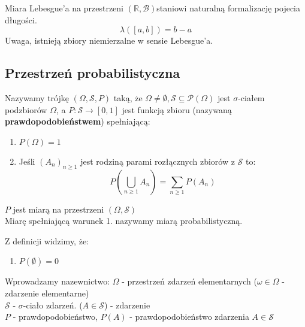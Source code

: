 \documentclass{article}
\newenvironment{definition}[1]{%
    \trivlist
    \item[\hskip\labelsep\textbf{Definition. #1.}]
    \ignorespaces
}{%
    \endtrivlist
}
\newenvironment{fact}[1]{%
    \trivlist
    \item[\hskip\labelsep\textbf{Fact. #1.}]
    \ignorespaces
}{%
    \endtrivlist
}
\newenvironment{information}[1]{%
    \trivlist
    \item[\hskip\labelsep\textbf{Information. #1.}]
    \ignorespaces
}{%
    \endtrivlist
}
\begin{document}
\begin{information}{Miara Lebesgue'a}
    Miara Lebesgue'a na przestrzeni \( (\mathbb{R}, \mathcal{B}) \)staniowi naturalną formalizację pojecia długości.
    \[
    \lambda([a,b]) = b - a
    \]
    Uwaga, istnieją zbiory niemierzalne w sensie Lebesgue'a.
\end{information}

\subsection{Przestrzeń probabilistyczna}

\begin{definition}{Przestrzeń Probabilistyczna}
    Nazywamy trójkę $(\Omega, \mathcal{S}, P)$ taką, że \( \Omega \neq \emptyset, \mathcal{S} \subseteq \mathcal{P}(\Omega) \) jest $\sigma$-ciałem podzbiorów $\Omega$, a $P: \mathcal{S} \rightarrow [0,1]$ jest funkcją zbioru (nazywaną \textbf{prawdopodobieństwem}) spełniającą:\
    \begin{enumerate}
        \item \( P(\Omega) = 1\)
        \item Jeśli $(A_n)_{n\geq 1}$ jest rodziną parami rozłącznych zbiorów z $\mathcal{S}$ to:
        \[
        P\left(\bigcup_{n\geq 1} A_n \right) = \sum_{n\geq 1} P(A_n)
        \]
    \end{enumerate}
    $P$ jest miarą na przestrzeni $(\Omega, \mathcal{S})$\\
    Miarę spełniającą warunek 1. nazywamy miarą probabilistyczną.
\end{definition}

\begin{fact}{Fakty z Przestrzeni probabilistycznych}
    Z definicji widzimy, że:
    \begin{enumerate}
        \item $P(\emptyset) = 0$
    \end{enumerate}    
\end{fact}

\begin{information}{Notacja w Przestrzeni probabilistycznej}
    Wprowadzamy nazewnictwo:
    $\Omega$ - przestrzeń zdarzeń elementarnych ($\omega \in \Omega$ - zdarzenie elementarne)\\
    $\mathcal{S}$ - $\sigma$-ciało zdarzeń. ($A\in \mathcal{S}$) - zdarzenie\\
    $P$ - prawdopodobieństwo, $P(A)$ - prawdopodobieństwo zdarzenia $A\in \mathcal{S}$
\end{information}
\end{document}
